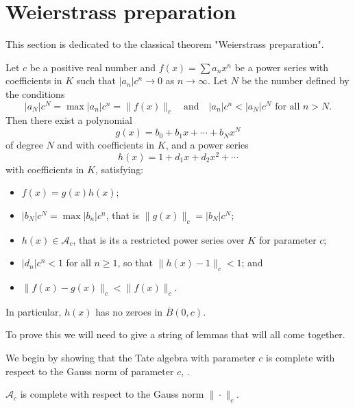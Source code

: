 \chapter{Weierstrass preparation}

This section is dedicated to the classical theorem "Weierstrass preparation".


\begin{theorem}\label{WP}
    Let $c$ be a positive real number and $f (x) = \sum a_n x^n$ be a power series with coefficients
    in $K$ such that $ \lvert a_n \rvert c^n \to 0$ as $n \to \infty$. Let $N$ be the number defined
    by the conditions
    \[
    \lvert a_N \rvert c^N = \max \lvert a_n \rvert c^n = \|f(x)\|_c \quad \text{and} \quad
    \lvert a_n \rvert c^n < \lvert a_N \rvert c^N \text{ for all } n > N.
    \]
    Then there exist a polynomial
    \[
    g(x) = b_0 + b_1x + \cdots + b_N x^N
    \]
    of degree $N$ and with coefficients in $K$, and a power series
    \[
    h(x) = 1 + d_1 x + d_2 x^2 + \cdots
    \]
    with coefficients in $K$, satisfying:
    \begin{itemize}
        \item $f(x) = g(x) h(x)$;
        \item $\lvert b_N \rvert c^N = \max \lvert b_n \rvert c^n$, that is
        $\| g (x) \|_c = \lvert b_N \rvert c^N$;
        \item $h(x) \in \mathcal{A}_c$, that is its a restricted power series over $K$ for
        parameter $c$;
        \item $\lvert d_n \rvert c^n < 1$ for all $n \geq 1$, so that $\| h(x) - 1 \|_c < 1$; and
        \item $\| f(x) - g(x) \|_c < \| f(x)\|_c.$
    \end{itemize}
    In particular, $h(x)$ has no zeroes in $\overline{B}(0,c)$.
\end{theorem}

To prove this we will need to give a string of lemmas that will all come together.

We begin by showing that the Tate algebra with parameter $c$ is complete with respect to the Gauss
norm of parameter $c$, \cite[Lemma~7.2.7]{Gouvea}.

\begin{lemma}
    $\mathcal{A}_c$ is complete with respect to the Gauss norm $\|\cdot \|_c$.
\end{lemma}

